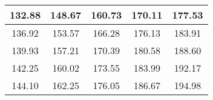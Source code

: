 \begin{large}\begin{tabular}{|c|c|c|c|c|}
\hline
132.88&148.67&160.73&170.11&177.53\\\hline
136.92&153.57&166.28&176.13&183.91\\\hline
139.93&157.21&170.39&180.58&188.60\\\hline
142.25&160.02&173.55&183.99&192.17\\\hline
144.10&162.25&176.05&186.67&194.98\\\hline
\end{tabular}
\end{large}
